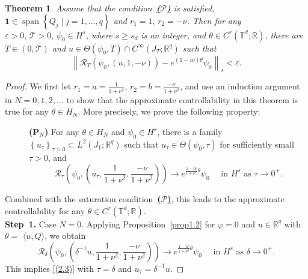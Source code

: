 \documentclass[review]{elsarticle}
\newtheorem{theorem}{Theorem}[section]
\theoremstyle{dotless}
\def \geq{\geqslant}
\numberwithin{equation}{section}
\begin{document}
\begin{theorem}\label{thm2.2}
Assume that the condition~{\hyperlink{H1}{\textbf{($\mathscr{P}$)}}} is satisfied, $ \mathbf{1}\in \operatorname{span}\left\{Q_j\mid j=1, \ldots, q\right\} $ and $ r_1=1,\, r_2=-\nu $.
Then for any $\varepsilon>0,\, \mathcal{T}>0,\, \psi_0 \in H^s$, where $s \geq s_d$ is an integer, and $\theta \in C^r\left(\mathbb{T}^d ; \mathbb{R}\right)$, there are $T \in(0, \mathcal{T})$ and $u \in \Theta\left(\psi_0, T\right) \cap C^{\infty}\left(J_T ; \mathbb{R}^q\right)$ such that
\begin{equation}\label{(2.2)}
\left\|\mathcal{R}_T\left(\psi_0, (u,1,-\nu)\right)-e^{(1-i\nu) \theta} \psi_0\right\|_s<\varepsilon.
\end{equation}
\end{theorem}
\begin{proof}
We first let $ r_1=a=\frac{1}{1+\nu^2},\, r_2 = b =\frac{-\nu}{1+\nu^2} $, and
use an induction argument in $N=0,1,2,...$ to show that the approximate controllability in this theorem is true for any $\theta \in H_N$. 
More precisely, we prove the following property:
\begin{description}\item[\hypertarget{PN}]{\textbf{(P$_N$)}}  
For any $\theta \in H_N$ and $\psi_0 \in H^s$, there is a family $\left\{u_\tau\right\}_{\tau>0} \subset L^2\left(J_1 ; \mathbb{R}^q\right)$ such that $u_\tau \in \Theta\left(\psi_0, \tau\right)$ for sufficiently small $\tau>0$, and
\begin{equation}\label{(2.3)}
\mathcal{R}_\tau\left(\psi_0, \left(u_\tau,\frac{1}{1+\nu^2},\frac{-\nu}{1+\nu^2}\right)\right) \rightarrow e^{\frac{1-i\nu}{1+\nu^2} \theta} \psi_0 \quad \text { in } H^s \text { as } \tau \rightarrow 0^{+}.
\end{equation}
\end{description} 
Combined with the saturation condition~{\hyperlink{H1}{\textbf{($\mathscr{P}$)}}}, this leads to the approximate controllability for any $\theta \in C^r\left(\mathbb{T}^d ; \mathbb{R}\right)$.
\\
\textbf{Step~1.} Case $N=0$. Applying Proposition~\ref{prop1.2} for $\varphi=0$ and $u \in \mathbb{R}^q$ with $\theta=$ $\langle u, Q\rangle$, we obtain
$$
\mathcal{R}_\delta\left(\psi_0, \left(\delta^{-1} u,\frac{1}{1+\nu^2},\frac{-\nu}{1+\nu^2}\right)\right) \rightarrow e^{\frac{1-i\nu}{1+\nu^2} \theta } \psi_0 \quad \text { in } H^s \text { as } \delta \rightarrow 0^{+}.
$$
This implies \eqref{(2.3)} with $\tau=\delta$ and $u_\tau=\delta^{-1} u$.

\end{proof}
\end{document}
